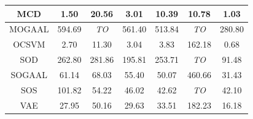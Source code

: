 \documentclass{article}
\begin{document}
\begin{table}[!t]
\begin{tabular}{|c|c|c|c|c|c|c|}
\hline
MCD &                1.50 &          20.56 &               3.01 &              10.39 &            10.78 &             1.03 \\
\hline
MOGAAL &              594.69 &    \textit{TO} &             561.40 &             513.84 &      \textit{TO} &           280.80 \\
\hline
OCSVM &                2.70 &          11.30 &               3.04 &               3.83 &           162.18 &             0.68 \\
\hline
SOD &              262.80 &         281.86 &             195.81 &             253.71 &      \textit{TO} &            91.48 \\
\hline
SOGAAL &               61.14 &          68.03 &              55.40 &              50.07 &           460.66 &            31.43 \\
\hline
SOS &              101.82 &          54.22 &              46.02 &              42.62 &      \textit{TO} &            42.10 \\
\hline
VAE &               27.95 &          50.16 &              29.63 &              33.51 &           182.23 &            16.18 \\
\hline
\end{tabular}
\end{table}




\end{document}
